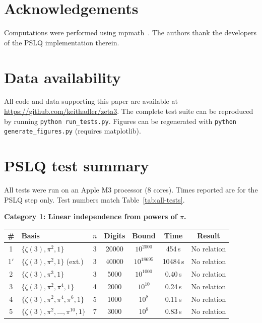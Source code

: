 \documentclass[12pt]{article}
\theoremstyle{definition}
\theoremstyle{remark}
\begin{document}
\section*{Acknowledgements}

Computations were performed using mpmath~\cite{mpmath}.  The authors
thank the developers of the PSLQ implementation therein.

\section*{Data availability}

All code and data supporting this paper are available at
\url{https://github.com/keithadler/zeta3}.  The complete test suite can
be reproduced by running \texttt{python run\_tests.py}.  Figures can be
regenerated with \texttt{python generate\_figures.py} (requires
matplotlib).





\appendix

\section{PSLQ test summary}\label{app:summary}

All tests were run on an Apple M3 processor (8 cores).  Times reported
are for the PSLQ step only.  Test numbers match
Table~\ref{tab:all-tests}.

\medskip\noindent\textbf{Category 1: Linear independence from powers of $\pi$.}

\begin{center}
\begin{tabular}{@{}clccccc@{}}
\toprule
\# & Basis & $n$ & Digits & Bound & Time & Result \\
\midrule
1 & $\{\zeta(3),\pi^2,1\}$ & 3 & 20000 & $10^{2000}$ & 454\,s & No relation \\
1$'$ & $\{\zeta(3),\pi^2,1\}$ (ext.) & 3 & 40000 & $10^{18695}$ & 10484\,s & No relation \\
2 & $\{\zeta(3),\pi^3,1\}$ & 3 & 5000 & $10^{1000}$ & 0.40\,s & No relation \\
3 & $\{\zeta(3),\pi^2,\pi^4,1\}$ & 4 & 2000 & $10^{10}$ & 0.24\,s & No relation \\
4 & $\{\zeta(3),\pi^2,\pi^4,\pi^6,1\}$ & 5 & 1000 & $10^8$ & 0.11\,s & No relation \\
5 & $\{\zeta(3),\pi^2,\ldots,\pi^{10},1\}$ & 7 & 3000 & $10^8$ & 0.83\,s & No relation \\
\bottomrule
\end{tabular}
\end{center}
\end{document}
